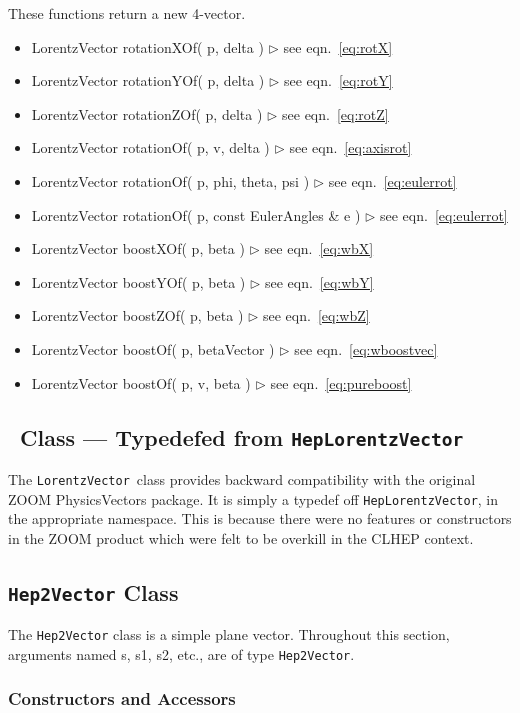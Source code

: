 \documentclass[twoside,12pt]{article}
\def \LV {{\tt HepLorentzVector}}
\def \LVz {{\tt LorentzVector}}
\newcommand {\see}[1] {\hfill$\triangleright$ see eqn.~#1}
\newenvironment{shortlist}{%
\begin{itemize}
\setlength{\itemsep}{0pt}
\setlength{\parskip}{0pt}
}{%
\end{itemize}
}
\begin{document}
\noindent
These functions return a new 4-vector.

\begin{shortlist}
  \item LorentzVector rotationXOf( p, delta ) \see{\ref{eq:rotX}}
  \item LorentzVector rotationYOf( p, delta ) \see{\ref{eq:rotY}}
  \item LorentzVector rotationZOf( p, delta ) \see{\ref{eq:rotZ}}
  \item LorentzVector rotationOf( p, v, delta ) \see{\ref{eq:axisrot}}

  \item LorentzVector rotationOf( p, phi, theta, psi ) \see{\ref{eq:eulerrot}}
  \item LorentzVector rotationOf( p, const EulerAngles \& e ) \see{\ref{eq:eulerrot}}

  \item LorentzVector boostXOf( p, beta ) \see{\ref{eq:wbX}}
  \item LorentzVector boostYOf( p, beta ) \see{\ref{eq:wbY}}
  \item LorentzVector boostZOf( p, beta ) \see{\ref{eq:wbZ}}
  \item LorentzVector boostOf( p, betaVector ) \see{\ref{eq:wboostvec}}
  \item LorentzVector boostOf( p, v, beta ) \see{\ref{eq:pureboost}}
\end{shortlist}


\subsection{\protect\LVz\ Class --- Typedefed from \LV }

The \LVz\ class provides backward compatibility with the original ZOOM
PhysicsVectors package.  
It is simply a typedef off \LV , in the appropriate namespace.
This is because there were no features or constructors in the ZOOM 
product which were felt to be 
overkill in the CLHEP context.  

\subsection{{\tt Hep2Vector} Class}

The {\tt Hep2Vector} class is a simple plane vector.
Throughout this section, arguments named s, s1, s2, etc., are of type 
{\tt Hep2Vector}.

\subsubsection{Constructors and Accessors}
\end{document}
